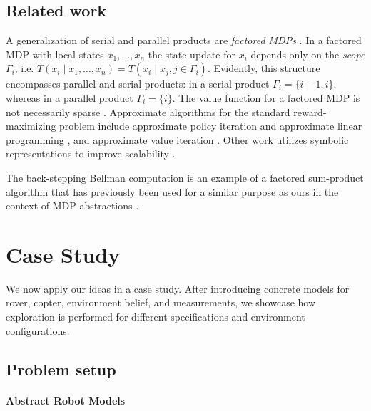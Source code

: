 \documentclass[conference]{IEEEtran}
\renewcommand{\cite}[1]{\citep{#1}}
\begin{document}
\subsection{Related work}
\label{sub:factored_mdp_work}

A generalization of serial and parallel products are \emph{factored MDPs} \cite{Boutilier2000}. In a factored MDP with local states $x_1, \ldots, x_n$ the state update for $x_i$ depends only on the \emph{scope} $\Gamma_i$, i.e. $T(x_i \mid x_1, \ldots, x_n) = T(x_i \mid x_j, j \in \Gamma_i)$. Evidently, this structure encompasses parallel and serial products: in a serial product $\Gamma_i = \{ i-1, i \}$, whereas in a parallel product $\Gamma_i = \{ i \}$. The value function for a factored MDP is not necessarily sparse \cite{Guestrin2003}. Approximate algorithms for the standard reward-maximizing problem include approximate policy iteration and approximate linear programming \cite{Guestrin2003}, and approximate value iteration \cite{Szita2008}. Other work utilizes symbolic representations to improve scalability \cite{Boutilier2000}.

The back-stepping Bellman computation is an example of a factored sum-product algorithm \cite{Kschischang2001} that has previously been used for a similar purpose as ours in the context of MDP abstractions \cite{EsmaeilZadehSoudjani2017}.



\section{Case Study}
\label{sec:casestudy}

We now apply our ideas in a case study. After introducing concrete models for rover, copter, environment belief, and measurements, we showcase how exploration is performed for different specifications and environment configurations.

\subsection{Problem setup}

\paragraph{Abstract Robot Models}
\end{document}
